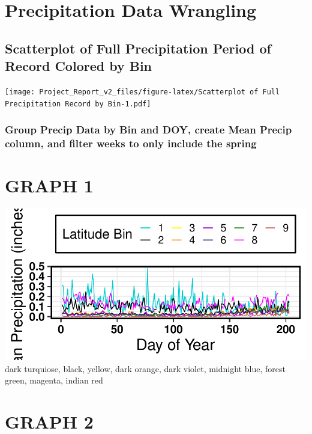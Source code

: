 \documentclass[12pt,]{article}
\begin{document}
\hypertarget{precipitation-data-wrangling}{%
\section{Precipitation Data
Wrangling}\label{precipitation-data-wrangling}}

\hypertarget{scatterplot-of-full-precipitation-period-of-record-colored-by-bin}{%
\subsection{Scatterplot of Full Precipitation Period of Record Colored
by
Bin}\label{scatterplot-of-full-precipitation-period-of-record-colored-by-bin}}

\texttt{[image: Project\_Report\_v2\_files/figure-latex/Scatterplot of Full Precipitation Record by Bin-1.pdf]}

\hypertarget{group-precip-data-by-bin-and-doy-create-mean-precip-column-and-filter-weeks-to-only-include-the-spring}{%
\subsubsection{Group Precip Data by Bin and DOY, create Mean Precip
column, and filter weeks to only include the
spring}\label{group-precip-data-by-bin-and-doy-create-mean-precip-column-and-filter-weeks-to-only-include-the-spring}}

\hypertarget{graph-1}{%
\section{GRAPH 1}\label{graph-1}}

\includegraphics{Project_Report_v2_files/figure-latex/unnamed-chunk-2-1.pdf}
dark turquiose, black, yellow, dark orange, dark violet, midnight blue,
forest green, magenta, indian red

\hypertarget{graph-2}{%
\section{GRAPH 2}\label{graph-2}}
\end{document}
